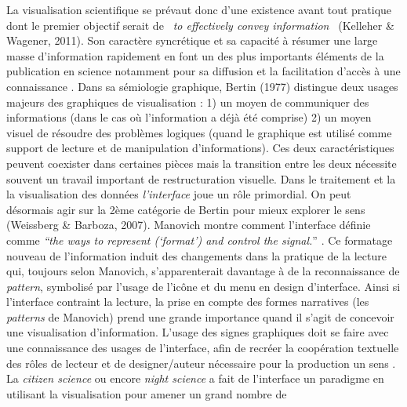 La visualisation scientifique se pr\'evaut donc d{\textquoteright}une
existence avant tout pratique dont le premier objectif serait de
\textit{{\guillemotleft}~to effectively convey
information~{\guillemotright} }(Kelleher \& Wagener, 2011). Son
caract\`ere syncr\'etique et sa capacit\'e \`a r\'esumer une large
masse d{\textquoteright}information rapidement en font un des plus
importants \'el\'ements de la publication en science notamment pour sa
diffusion et la facilitation d{\textquoteright}acc\`es \`a une
connaissance \cite{Ware2004}. Dans sa s\'emiologie graphique, Bertin
(1977) distingue deux usages majeurs des graphiques de visualisation :
1) un moyen de communiquer des informations (dans le cas o\`u
l{\textquoteright}information a d\'ej\`a \'et\'e comprise) 2) un moyen
visuel de r\'esoudre des probl\`emes logiques (quand le graphique est
utilis\'e comme support de lecture et de manipulation
d{\textquoteright}informations). Ces deux caract\'eristiques peuvent
coexister dans certaines pi\`eces mais la transition entre les deux
n\'ecessite souvent un travail important de restructuration visuelle.
Dans le traitement et la la visualisation des donn\'ees
\textit{l{\textquoteright}interface }joue un r\^ole primordial. On peut
d\'esormais agir sur la 2\`eme cat\'egorie de Bertin pour mieux
explorer le sens (Weissberg \& Barboza, 2007). Manovich montre comment
l{\textquoteright}interface d\'efinie comme
\textit{{\textquotedblleft}the ways to represent
({\textquoteleft}format{\textquoteright}) and control the
signal.}{\textquotedblright} \cite{Manovich2013}. Ce formatage nouveau de
l{\textquoteright}information induit des changements dans la pratique
de la lecture qui, toujours selon Manovich,
s{\textquoteright}apparenterait davantage \`a de la reconnaissance de
\textit{pattern}, symbolis\'e par l{\textquoteright}usage de
l{\textquoteright}ic\^one et du menu en design
d{\textquoteright}interface. Ainsi si l{\textquoteright}interface
contraint la lecture, la prise en compte des formes narratives (les
\textit{patterns} de Manovich) prend une grande importance quand il
s{\textquoteright}agit de concevoir une visualisation
d{\textquoteright}information. L{\textquoteright}usage des signes
graphiques doit se faire avec une connaissance des usages de
l{\textquoteright}interface, afin de recr\'eer la coop\'eration
textuelle des r\^oles de lecteur et de designer/auteur n\'ecessaire
pour la production un sens \cite{Eco1985}. La \textit{citizen science} ou
encore \textit{night science} a fait de l{\textquoteright}interface un
paradigme en utilisant la visualisation pour amener un grand nombre de
